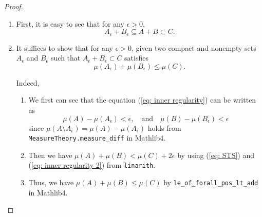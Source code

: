\begin{proof}
\begin{enumerate}
\begin{enumerate}
            \item First, it is easy to see that for any \(\epsilon>0\),
            \begin{equation*}
                A_\epsilon + B_\epsilon \subseteq A + B \subset C.
            \end{equation*}

            \item It suffices to show that for any \(\epsilon>0\), given two compact and {\color{red}nonempty} sets \(A_\epsilon\) and \(B_\epsilon\) such that
            {\color{red}
            \(A_\epsilon + B_\epsilon \subset C\) satisfies
            \begin{equation}
                \mu(A_\epsilon) + \mu(B_\epsilon) \leq \mu(C).
                \label{eq: STS}
            \end{equation}
            }

            Indeed,
            \begin{enumerate}
            \item
              We first can see that the equation (\ref{eq: inner regularity}) can be written as
              \begin{equation}
                \mu(A)-\mu(A_\epsilon) < \epsilon, \quad \text{and} \quad \mu(B) - \mu(B_\epsilon) < \epsilon
                \label{eq: inner regularity 2}
              \end{equation}
              since \(\mu(A\setminus A_\epsilon) = \mu(A)-\mu(A_\epsilon)\) holds from \texttt{MeasureTheory.measure\_diff} in Mathlib4.

            \item Then we have \(\mu(A) + \mu(B) < \mu(C) + 2\epsilon\) by using (\ref{eq: STS}) and (\ref{eq: inner regularity 2}) from \texttt{linarith}.

            \item Thus, we have \(\mu(A) + \mu(B) \leq \mu(C)\) by \texttt{le\_of\_forall\_pos\_lt\_add} in Mathlib4.
            \end{enumerate}
        \end{enumerate}








\end{enumerate}
\end{proof}
